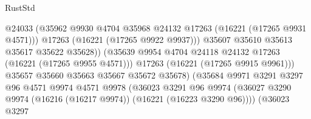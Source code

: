 \begin{lexlean}{RustStd}
\begin{coremodule}
                                              @24033
                                              (@35962
                                                @9930
                                                @4704
                                                @35968
                                                @24132
                                                @17263
                                                (@16221 (@17265 @9931 @4571)))
                                              @17263
                                              (@16221 (@17265 @9922 @9937)))
                                            @35607
                                            @35610
                                            @35613
                                            @35617
                                            @35622
                                            @35628))
                                        (@35639
                                          @9954
                                          @4704
                                          @24118
                                          @24132
                                          @17263
                                          (@16221 (@17265 @9955 @4571)))
                                        @17263
                                        (@16221 (@17265 @9915 @9961)))
                                      @35657
                                      @35660
                                      @35663
                                      @35667
                                      @35672
                                      @35678)
                                    (@35684
                                      @9971
                                      @3291
                                      @3297
                                      @96
                                      @4571
                                      @9974
                                      @4571
                                      @9978
                                      (@36023
                                        @3291
                                        @96
                                        @9974
                                        (@36027
                                          @3290
                                          @9974
                                          (@16216 (@16217 @9974))
                                          (@16221 (@16223 @3290 @96))))
                                      (@36023
                                        @3297

\end{coremodule}
\end{lexlean}
